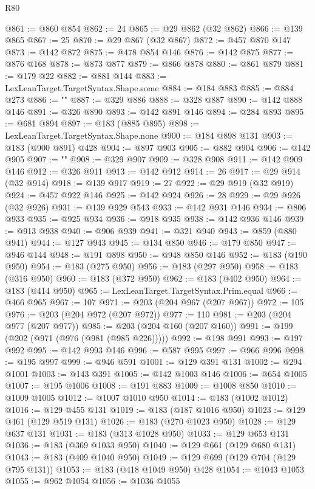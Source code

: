 \begin{lexlean}{R80}
\begin{coremodule}
@861 := @860 @854
@862 := 24
@865 := @29 @862 (@32 @862)
@866 := @139 @865
@867 := 25
@870 := @29 @867 (@32 @867)
@872 := @457 @870 @147
@873 := @142 @872
@875 := @478 @854 @146
@876 := @142 @875
@877 := @876 @168
@878 := @873 @877
@879 := @866 @878
@880 := @861 @879
@881 := @179 @22
@882 := @881 @144
@883 := LexLeanTarget.TargetSyntax.Shape.some
@884 := @184 @883
@885 := @884 @273
@886 := "{"
@887 := @329 @886
@888 := @328 @887
@890 := @142 @888 @146
@891 := @326 @890
@893 := @142 @891 @146
@894 := @284 @893
@895 := @681 @894
@897 := @183 (@885 @895)
@898 := LexLeanTarget.TargetSyntax.Shape.none
@900 := @184 @898 @131
@903 := @183 (@900 @891) @428
@904 := @897 @903
@905 := @882 @904
@906 := @142 @905
@907 := "}"
@908 := @329 @907
@909 := @328 @908
@911 := @142 @909 @146
@912 := @326 @911
@913 := @142 @912
@914 := 26
@917 := @29 @914 (@32 @914)
@918 := @139 @917
@919 := 27
@922 := @29 @919 (@32 @919)
@924 := @457 @922 @146
@925 := @142 @924
@926 := 28
@929 := @29 @926 (@32 @926)
@931 := @139 @929 @543
@933 := @142 @931 @146
@934 := @806 @933
@935 := @925 @934
@936 := @918 @935
@938 := @142 @936 @146
@939 := @913 @938
@940 := @906 @939
@941 := @321 @940
@943 := @859 (@880 @941)
@944 := @127 @943
@945 := @134 @850
@946 := @179 @850
@947 := @946 @144
@948 := @191 @898
@950 := @948 @850 @146
@952 := @183 (@190 @950)
@954 := @183 (@275 @950)
@956 := @183 (@297 @950)
@958 := @183 (@316 @950)
@960 := @183 (@372 @950)
@962 := @183 (@402 @950)
@964 := @183 (@414 @950)
@965 := LexLeanTarget.TargetSyntax.Prim.equal
@966 := @466 @965
@967 := 107
@971 := @203 (@204 @967 (@207 @967))
@972 := 105
@976 := @203 (@204 @972 (@207 @972))
@977 := 110
@981 := @203 (@204 @977 (@207 @977))
@985 := @203 (@204 @160 (@207 @160))
@991 := @199 (@202 (@971 (@976 (@981 (@985 @226)))))
@992 := @198 @991
@993 := @197 @992
@995 := @142 @993 @146
@996 := @587 @995
@997 := @966 @996
@998 := @195 @997
@999 := @946 @591
@1001 := @129 @391 @131
@1002 := @294 @1001
@1003 := @143 @391
@1005 := @142 @1003 @146
@1006 := @654 @1005
@1007 := @195 @1006
@1008 := @191 @883
@1009 := @1008 @850
@1010 := @1009 @1005
@1012 := @1007 @1010 @950
@1014 := @183 (@1002 @1012)
@1016 := @129 @455 @131
@1019 := @183 (@187 @1016 @950)
@1023 := @129 @461 (@129 @519 @131)
@1026 := @183 (@270 @1023 @950)
@1028 := @129 @637 @131
@1031 := @183 (@313 @1028 @950)
@1033 := @129 @653 @131
@1036 := @183 (@369 @1033 @950)
@1040 := @129 @661 (@129 @680 @131)
@1043 := @183 (@409 @1040 @950)
@1049 := @129 @699 (@129 @704 (@129 @795 @131))
@1053 := @183 (@418 @1049 @950) @428
@1054 := @1043 @1053
@1055 := @962 @1054
@1056 := @1036 @1055

\end{coremodule}
\end{lexlean}
